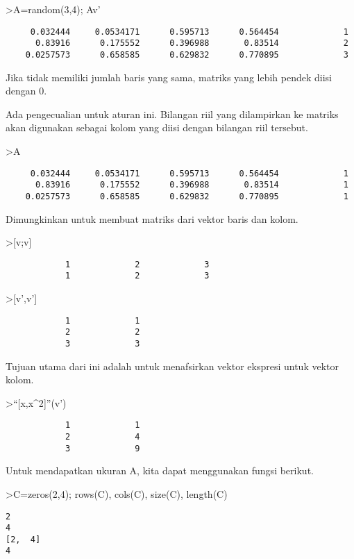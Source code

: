 \documentclass[
]{book}
\begin{document}
\textgreater A=random(3,4); A\textbar v'

\begin{verbatim}
     0.032444     0.0534171      0.595713      0.564454             1 
      0.83916      0.175552      0.396988       0.83514             2 
    0.0257573      0.658585      0.629832      0.770895             3 
\end{verbatim}

Jika tidak memiliki jumlah baris yang sama, matriks yang lebih pendek diisi dengan 0.

Ada pengecualian untuk aturan ini. Bilangan riil yang dilampirkan ke matriks akan digunakan sebagai kolom yang diisi dengan bilangan riil tersebut.

\textgreater A

\begin{verbatim}
     0.032444     0.0534171      0.595713      0.564454             1 
      0.83916      0.175552      0.396988       0.83514             1 
    0.0257573      0.658585      0.629832      0.770895             1 
\end{verbatim}

Dimungkinkan untuk membuat matriks dari vektor baris dan kolom.

\textgreater{[}v;v{]}

\begin{verbatim}
            1             2             3 
            1             2             3 
\end{verbatim}

\textgreater{[}v',v'{]}

\begin{verbatim}
            1             1 
            2             2 
            3             3 
\end{verbatim}

Tujuan utama dari ini adalah untuk menafsirkan vektor ekspresi untuk vektor kolom.

\textgreater{}``{[}x,x\^{}2{]}''(v')

\begin{verbatim}
            1             1 
            2             4 
            3             9 
\end{verbatim}

Untuk mendapatkan ukuran A, kita dapat menggunakan fungsi berikut.

\textgreater C=zeros(2,4); rows(C), cols(C), size(C), length(C)

\begin{verbatim}
2
4
[2,  4]
4
\end{verbatim}
\end{document}
